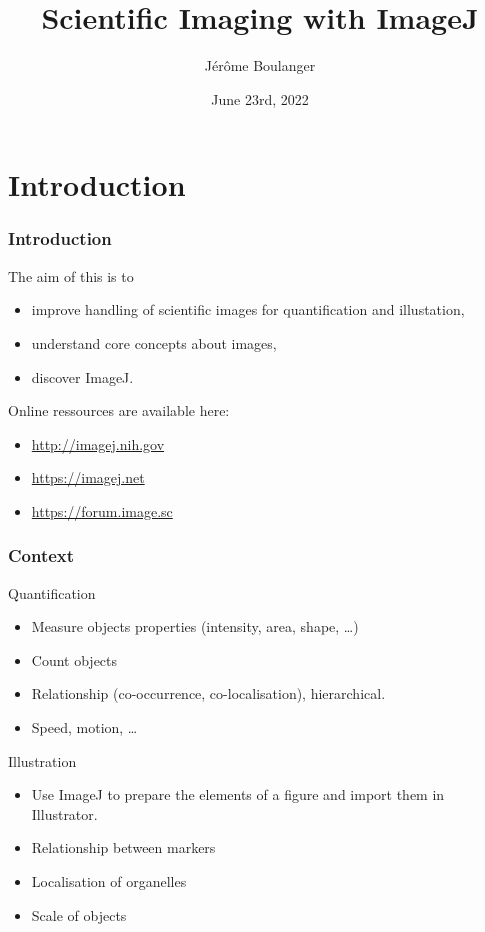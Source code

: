 \documentclass[ignorenonframetext,aspectratio=169,10pt,xcolor=table]{beamer}
\title{Scientific Imaging with ImageJ}
\author{J\'er\^ome Boulanger}
\date{June 23rd, 2022}
\begin{document}
\begin{frame}
  \maketitle
\end{frame}

\section{Introduction}

\begin{frame} \frametitle<presentation>{Introduction} The aim of this
   is to
  \begin{itemize}
  \item improve handling of scientific images for quantification and
    illustation,
  \item understand core concepts about images,
  \item discover ImageJ.
  \end{itemize} Online ressources are available here:
  \begin{itemize}
  \item \url{http://imagej.nih.gov}
  \item \url{https://imagej.net}
  \item \url{https://forum.image.sc}
  \end{itemize}
\end{frame}

\begin{frame} \frametitle{Context}
  \begin{block}{Quantification}
    \begin{itemize}
    \item Measure objects properties (intensity, area, shape, \dots)
    \item Count objects
    \item Relationship (co-occurrence, co-localisation), hierarchical.
    \item Speed, motion, \dots
    \end{itemize}
  \end{block}
  \begin{block}{Illustration}

    \begin{itemize}
    \item Use ImageJ to prepare the elements of a figure and import
      them in Illustrator.
    \item Relationship between markers
    \item Localisation of organelles
    \item Scale of objects
    \end{itemize}
  \end{block}
\end{frame}
\end{document}
